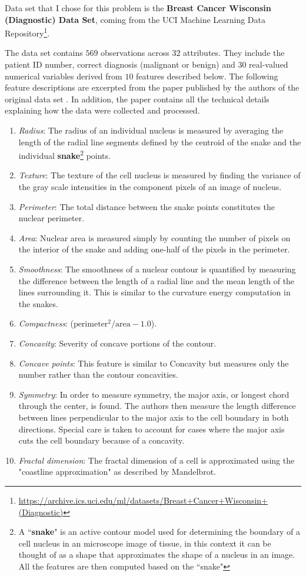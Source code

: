 \documentclass[10pt, a4paper]{article}
\begin{document}
Data set that I chose for this problem is the \textbf{Breast Cancer Wisconsin (Diagnostic) Data Set}, coming from the UCI Machine Learning Data Repository\footnote{\scriptsize \url{https://archive.ics.uci.edu/ml/datasets/Breast+Cancer+Wisconsin+(Diagnostic)}}.

The data set contains $569$ observations across $32$ attributes. They include the patient ID number, correct diagnosis (malignant or benign) and $30$ real-valued numerical variables derived from $10$ features described below. The following feature descriptions are excerpted from the paper published by the authors of the original data set \cite{feature-extraction}. In addition, the paper contains all the technical details explaining how the data were collected and processed.

\begin{enumerate}
	\item \textit{Radius}: The radius of an individual nucleus is measured by averaging the length of the radial line segments defined by the centroid of the snake and the individual \textbf{snake}\footnote{A ``\textbf{snake}" is an active contour model used for determining the boundary of a cell nucleus in an microscope image of tissue, in this context it can be thought of as a shape that approximates the shape of a nucleus in an image. All the features are then computed based on the ``snake"} points.
	\item \textit{Texture}: The texture of the cell nucleus is measured by finding the variance of the gray scale intensities in the component pixels of an image of nucleus.
	\item \textit{Perimeter}: The total distance between the snake points constitutes the nuclear perimeter.
	\item \textit{Area}: Nuclear area is measured simply by counting the number of pixels on the interior of the snake and adding one-half of the pixels in the perimeter.
	\item \textit{Smoothness}: The smoothness of a nuclear contour is quantified by measuring the difference between the length of a radial line and the mean length of the lines surrounding it. This is similar to the curvature energy computation in the snakes.
	\item \textit{Compactness}: ($\text{perimeter}^2 / \text{area} - 1.0$).
	\item \textit{Concavity}: Severity of concave portions of the contour.
	\item \textit{Concave points}: This feature is similar to Concavity but measures only the number rather than the contour concavities.
	\item \textit{Symmetry}: In order to measure symmetry, the major axis, or longest chord through the center, is found. The authors then measure the length difference between lines perpendicular to the major axis to the cell boundary in both directions. Special care is taken to account for cases where the major axis cuts the cell boundary because of a concavity.
	\item \textit{Fractal dimension}: The fractal dimension of a cell is approximated using the "coastline approximation" as described by Mandelbrot\cite{mandelbrot}.
\end{enumerate}
\end{document}
